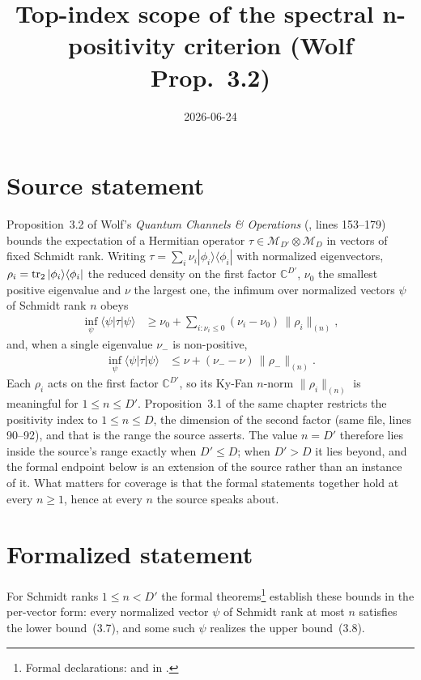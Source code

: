 \documentclass{article}
\title{Top-index scope of the spectral n-positivity criterion (Wolf Prop.~3.2)}
\author{}
\date{2026-06-24}
\begin{document}
\maketitle
{}

\section{Source statement}

Proposition~3.2 of Wolf's \emph{Quantum Channels \& Operations}
(, lines
153--179) bounds the expectation of a Hermitian operator
$\tau\in\mathcal{M}_{D'}\otimes\mathcal{M}_{D}$ in vectors of fixed Schmidt
rank. Writing $\tau=\sum_i\nu_i|\phi_i\rangle\langle\phi_i|$ with normalized
eigenvectors, $\rho_i=\operatorname{tr}_2|\phi_i\rangle\langle\phi_i|$ the reduced density on
the first factor $\mathbb{C}^{D'}$, $\nu_0$ the smallest positive eigenvalue and
$\nu$ the largest one, the infimum over normalized vectors $\psi$ of Schmidt
rank $n$ obeys
\begin{align}
  \inf_{\psi}\langle\psi|\tau|\psi\rangle
  &\ge \nu_0 + \sum_{i:\nu_i\le 0}(\nu_i-\nu_0)\,\|\rho_i\|_{(n)},
  \tag{3.7}
\end{align}
and, when a single eigenvalue $\nu_-$ is non-positive,
\begin{align}
  \inf_{\psi}\langle\psi|\tau|\psi\rangle
  &\le \nu + (\nu_- - \nu)\,\|\rho_-\|_{(n)}.
  \tag{3.8}
\end{align}
Each $\rho_i$ acts on the first factor $\mathbb{C}^{D'}$, so its Ky-Fan
$n$-norm $\|\rho_i\|_{(n)}$ is meaningful for $1\le n\le D'$. Proposition~3.1 of
the same chapter restricts the positivity index to $1\le n\le D$, the dimension
of the second factor (same file, lines 90--92), and that is the range the source
asserts. The value $n=D'$ therefore lies inside the source's range exactly when
$D'\le D$; when $D'>D$ it lies beyond, and the formal endpoint below is an
extension of the source rather than an instance of it. What matters for coverage
is that the formal statements together hold at every $n\ge1$, hence at every $n$
the source speaks about.

\section{Formalized statement}

For Schmidt ranks $1\le n<D'$ the formal theorems\footnote{Formal declarations:
     and
     in
    .}
establish these bounds in the per-vector form: every normalized vector $\psi$ of
Schmidt rank at most $n$ satisfies the lower bound~(3.7), and some such $\psi$
realizes the upper bound~(3.8).
\end{document}
